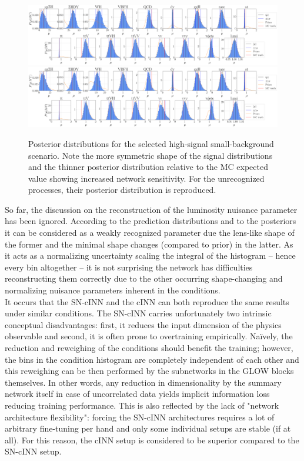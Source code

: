 \begin{figure}[h!]
	\centering
	\includegraphics[width=\linewidth]{figures/inference/194finalNoSummarye11000_posteriors}
	\includegraphics[width=\linewidth]{figures/inference/194finalSummary1Layer11000e300NodesCdim100_posteriors}
	\caption{Posterior distributions for the selected high-signal small-background scenario. Note the more symmetric shape of the signal distributions and the thinner posterior distribution relative to the MC expected value showing increased network sensitivity. For the unrecognized processes, their posterior distribution is reproduced.}
	\label{fig:HS-SM}
\end{figure}

So far, the discussion on the reconstruction of the luminosity nuisance parameter has been ignored. According to the prediction distributions and to the posteriors it can be considered as a weakly recognized parameter due the lens-like shape of the former and the minimal shape changes (compared to prior) in the latter. As it acts as a normalizing uncertainty scaling the integral of the histogram -- hence every bin altogether -- it is not surprising the network has difficulties reconstructing them correctly due to the other occurring shape-changing and normalizing nuisance parameters inherent in the conditions.\\

It occurs that the SN-cINN and the cINN can both reproduce the same results under similar conditions. The SN-cINN carries unfortunately two intrinsic conceptual disadvantages: first, it reduces the input dimension of the physics observable and second, it is often prone to overtraining empirically. Naïvely, the reduction and reweighing of the conditions should benefit the training; however, the bins in the condition histogram are completely independent of each other and this reweighing can be then performed by the subnetworks in the GLOW blocks themselves. In other words, any reduction in dimensionality by the summary network itself in case of uncorrelated data yields implicit information loss reducing training performance. This is also reflected by the lack of "network architecture flexibility": forcing the SN-cINN architectures requires a lot of arbitrary fine-tuning per hand and only some individual setups are stable (if at all). For this reason, the cINN setup is considered to be superior compared to the SN-cINN setup.


